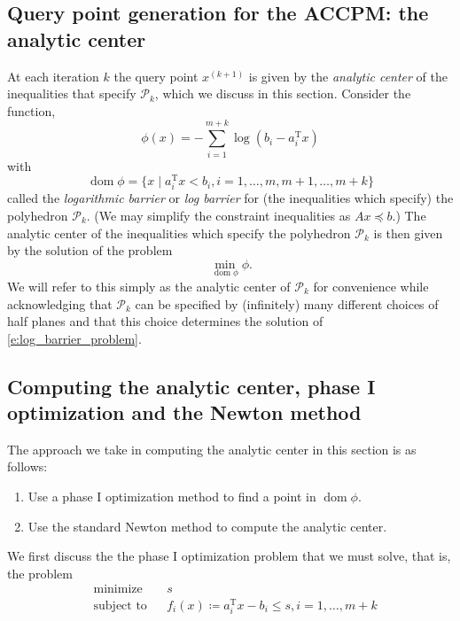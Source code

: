 \documentclass[11pt]{amsart}
\theoremstyle{definition}
\theoremstyle{remark}
\newcommand{\transpose}{\text{T}}
\DeclareMathOperator{\domain}{dom}
\begin{document}
    \subsection{Query point generation for the ACCPM: the analytic center}
        At each iteration $k$ the query point $x^{(k+1)}$ is given by the \emph{analytic center} of the inequalities that specify $\mathcal{P}_k$, which we discuss in this section. Consider the function,
        \begin{equation}
            \phi(x) = - \sum_{i=1}^{m+k}{\log{(b_i - a_i^\transpose x)}}
        \end{equation}
        with 
        \begin{equation}
            \domain \phi = \{x \;|\; a_i^\transpose x < b_i, i = 1, \dots, m, m+1, \dots, m+k\}
        \end{equation}
        called the \emph{logarithmic barrier} or \emph{log barrier} for (the inequalities which specify) the polyhedron $\mathcal{P}_k$. (We may simplify the constraint inequalities as $Ax \preceq b$.) The analytic center of the inequalities which specify the polyhedron $\mathcal{P}_k$ is then given by the solution of the problem 
        \begin{equation}\label{e:log_barrier_problem}
            \min_{\domain \phi} \phi.
        \end{equation}
        We will refer to this simply as the analytic center of $\mathcal{P}_k$ for convenience while acknowledging that $\mathcal{P}_k$ can be specified by (infinitely) many different choices of half planes and that this choice determines the solution of \eqref{e:log_barrier_problem}.

    \subsection{Computing the analytic center, phase I optimization and the Newton method}
        The approach we take in computing the analytic center in this section is as follows:
        \begin{enumerate}
            \item Use a phase I optimization method to find a point in $\domain \phi$.
            \item Use the standard Newton method to compute the analytic center.
        \end{enumerate}

        We first discuss the the phase I optimization problem that we must solve, that is, the problem
        \begin{equation}\label{e:phase_i_accpm}
            \begin{aligned}
            & {\text{minimize}} && s  \\
            & \text{subject to} && f_i(x) \coloneqq a_i^\transpose x - b_i \leq s, i = 1, \dots, m+k \\
            \end{aligned}
        \end{equation}
\end{document}

